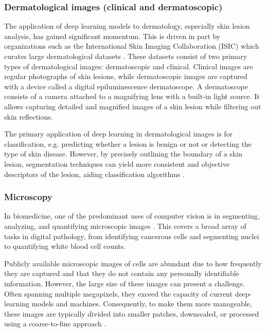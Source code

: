 \subsubsection{Dermatological images (clinical and dermatoscopic)}

The application of deep learning models to dermatology, especially skin lesion analysis, has gained significant momentum. This is driven in part by organizations such as the International Skin Imaging Collaboration (ISIC) which curates large dermatological datasets \cite{rotembergPatientcentricDatasetImages2021}. These datasets consist of two primary types of dermatological images: dermatoscopic and clinical. Clinical images are regular photographs of skin lesions, while dermatoscopic images are captured with a device called a digital epiluminescence dermatoscope. A dermatoscope consists of a camera attached to a magnifying lens with a built-in light source. It allows capturing detailed and magnified images of a skin lesion while filtering out skin reflections.

The primary application of deep learning in dermatological images is for classification, e.g. predicting whether a lesion is benign or not or detecting the type of skin disease. However, by precisely outlining the boundary of a skin lesion, segmentation techniques can yield more consistent and objective descriptors of the lesion, aiding classification algorithms \cite{rotembergPatientcentricDatasetImages2021}.

\subsubsection{Microscopy}

In biomedicine, one of the predominant uses of computer vision is in segmenting, analyzing, and quantifying microscopic images \cite{khanAutoCellSegRobustAutomatic2018}. This covers a broad array of tasks in digital pathology, from identifying cancerous cells and segmenting nuclei to quantifying white blood cell counts.

Publicly available microscopic images of cells are abundant due to how frequently they are captured and that they do not contain any personally identifiable information. However, the large size of these images can present a challenge. Often spanning multiple megapixels, they exceed the capacity of current deep-learning models and machines. Consequently, to make them more manageable, these images are typically divided into smaller patches, downscaled, or processed using a coarse-to-fine approach \cite{jhaInstanceSegmentationWhole2021a}.

